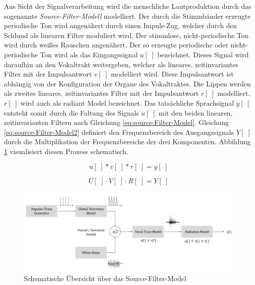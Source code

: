 Aus Sicht der Signalverarbeitung wird die menschliche Lautproduktion durch das sogenannte \emph{Source-Filter-Modell} modelliert. Der durch die Stimmbänder erzeugte periodische Ton wird angenähert durch einen Impuls-Zug, welcher durch den Schlund als linearen Filter moduliert wird. Der stimmlose, nicht-periodische Ton wird durch weißes Rauschen angenähert. Der so erzeugte periodische oder nicht-periodische Ton wird als das Eingangssignal $u[\;]$ bezeichnet. Dieses Signal wird daraufhin an den Vokaltrakt weitergeben, welcher als lineares, zeitinvariantes Filter mit der Impulsantwort $v[\;]$ modelliert wird. Diese Impulsantwort ist abhängig von der Konfiguration der Organe des Vokaltraktes. Die Lippen werden als zweites lineares, zeitinvariantes Filter mit der Impulsantwort $r[\;]$ modelliert. $r[\;]$ wird auch als \glqq radiant Model\grqq{} bezeichnet. Das tatsächliche Sprachsignal $y[\;]$ entsteht somit durch die Faltung des Signals $u[\;]$ mit den beiden linearen, zeitinvarianten Filtern nach Gleichung \ref{eq:source-Filter-Model}. Gleichung \ref{eq:source-Filter-Model2} definiert den Frequenzbereich des Ausgangssignals $Y[\;]$ durch die Multiplikation der Frequenzbereiche der drei Komponenten. Abbildung \ref{img:source-filter-model} visualisiert diesen Prozess schematisch. \cite[S. 62 - 63]{cryModel} \cite{speechProduction}

\begin{equation}
u[\;] * v[\;] * r[\;] = y[\;] 
\label{eq:source-Filter-Model}
\end{equation}

\begin{equation}
U[\;] \cdot V[\;] \cdot R[\;] = Y[\;] 
\label{eq:source-Filter-Model2}
\end{equation}

\begin{figure}[H]
	\centering
	\includegraphics[width=1\textwidth]{bilder/source-filter-model.png}
	\caption{Schematische Übersicht über das Source-Filter-Model \cite[nach Source estimation, S. 17]{ricardo_ceps}}
	\label{img:source-filter-model}
\end{figure}	

